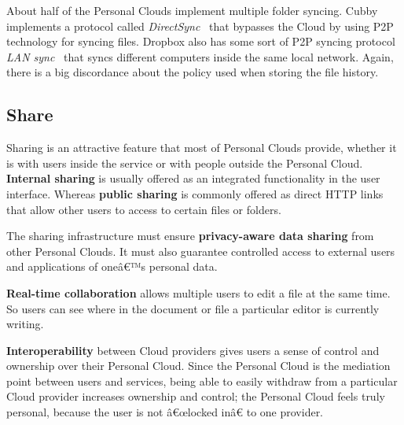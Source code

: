 About half of the Personal Clouds implement multiple folder syncing. Cubby implements a protocol called \textit{DirectSync}~\cite{directsync} that bypasses the Cloud by using P2P technology for syncing files. Dropbox also has some sort of P2P syncing protocol \textit{LAN sync}~\cite{lansync} that syncs different computers inside the same local network. Again, there is a big discordance about the policy used when storing the file history.




\subsection{Share}


Sharing is an attractive feature that most of Personal Clouds provide, whether it is with users inside the service or with people outside the Personal Cloud. \textbf{Internal sharing} is usually offered as an integrated functionality in the user interface. Whereas \textbf{public sharing} is commonly offered as direct HTTP links that allow other users to access to certain files or folders.

The sharing infrastructure must ensure \textbf{privacy-aware data sharing} from other Personal Clouds. It must also guarantee controlled access to external users and applications of oneâ€™s personal data.

\textbf{Real-time collaboration} allows multiple users to edit a file at the same time. So users can see where in the document or file a particular editor is currently writing.

\textbf{Interoperability} between Cloud providers gives users a sense of control and ownership over their Personal Cloud. Since the Personal Cloud is the mediation point between users and services, being able to easily withdraw from a particular Cloud provider increases ownership and control; the Personal Cloud feels truly personal, because the user is not â€œlocked inâ€ to one provider.


